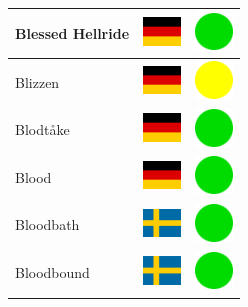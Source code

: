 \documentclass[12pt, a4paper, twoside]{report}
\begin{document}
\begin{center}
\begin{longtable}{|p{5cm}|p{2cm}|p{2cm}|}
 Blessed Hellride                                           & \includegraphics[width=1cm]{../4x3/de} &   \includegraphics[width=1cm]{../likes/y} \\ \hline
 Blizzen                                                    & \includegraphics[width=1cm]{../4x3/de} &   \includegraphics[width=1cm]{../likes/m} \\ \hline
 Blodtåke                                                   & \includegraphics[width=1cm]{../4x3/de} &   \includegraphics[width=1cm]{../likes/y} \\ \hline
 Blood                                                      & \includegraphics[width=1cm]{../4x3/de} &   \includegraphics[width=1cm]{../likes/y} \\ \hline
 Bloodbath                                                  & \includegraphics[width=1cm]{../4x3/se} &   \includegraphics[width=1cm]{../likes/y} \\ \hline
 Bloodbound                                                 & \includegraphics[width=1cm]{../4x3/se} &   \includegraphics[width=1cm]{../likes/y} \\ \hline

\end{longtable}
\end{center}
\end{document}
